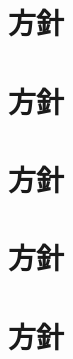 \section{\kaikeiDepartment{}方針}

\section{\kensuiDepartment{}方針}

\section{\syogaiDepartment{}方針}

\section{\systemDepartment{}方針}

\section{\soumuDepartment{}方針}

